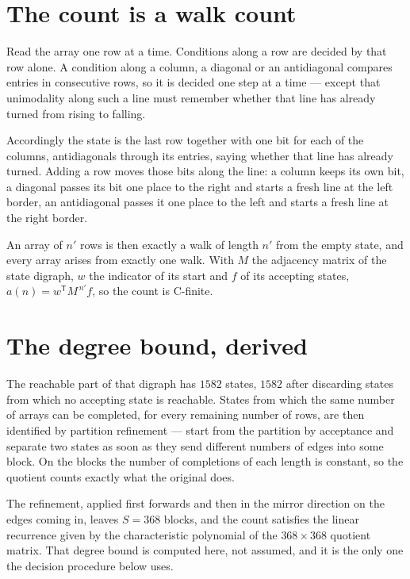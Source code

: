 \documentclass[11pt]{article}
\theoremstyle{definition}
\begin{document}
\section{The count is a walk count}

Read the array one row at a time. Conditions along a row are decided by that row alone. A condition along a column, a diagonal or an antidiagonal compares entries in consecutive rows, so it is decided one step at a time --- except that unimodality along such a line must remember whether that line has already turned from rising to falling.

Accordingly the state is the last row together with one bit for each of the columns, antidiagonals through its entries, saying whether that line has already turned. Adding a row moves those bits along the line: a column keeps its own bit, a diagonal passes its bit one place to the right and starts a fresh line at the left border, an antidiagonal passes it one place to the left and starts a fresh line at the right border.

An array of $n'$ rows is then exactly a walk of length $n'$ from the empty state, and every array arises from exactly one walk. With $M$ the adjacency matrix of the state digraph, $w$ the indicator of its start and $f$ of its accepting states, $a(n) = w^{\mathsf T}M^{\,n'}f$, so the count is C-finite.

\section{The degree bound, derived}

The reachable part of that digraph has $1582$ states, $1582$ after discarding states from which no accepting state is reachable. States from which the same number of arrays can be completed, for every remaining number of rows, are then identified by partition refinement --- start from the partition by acceptance and separate two states as soon as they send different numbers of edges into some block. On the blocks the number of completions of each length is constant, so the quotient counts exactly what the original does.

The refinement, applied first forwards and then in the mirror direction on the edges coming in, leaves $S = 368$ blocks, and the count satisfies the linear recurrence given by the characteristic polynomial of the $368 \times 368$ quotient matrix. That degree bound is computed here, not assumed, and it is the only one the decision procedure below uses.
\end{document}
